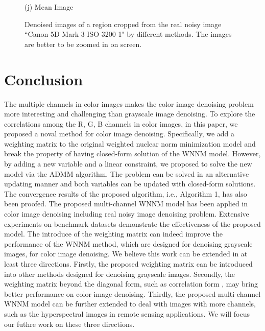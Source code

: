 \documentclass[10pt,twocolumn,letterpaper]{article}
\begin{document}
\begin{figure}
{\begin{minipage}[t]{0.195\textwidth}
{\footnotesize (j) Mean Image \cite{crosschannel2016}}
\end{minipage}
}\vspace{-0.5mm}
\caption{Denoised images of a region cropped from the real noisy image ``Canon 5D Mark 3 ISO 3200 1" \cite{crosschannel2016} by different methods. The images are better to be zoomed in on screen.}
\label{fig7}
\vspace{0.5mm}
\end{figure}

\section{Conclusion}

The multiple channels in color images makes the color image denoising problem more interesting and challenging than grayscale image denoising. To explore the correlations among the R, G, B channels in color images, in this paper, we proposed a noval method for color image denoising. Specifically, we add a weighting matrix to the original weighted nuclear norm minimization model and break the property of having closed-form solution of the WNNM model. However, by adding a new variable and a linear constraint, we proposed to solve the new model via the ADMM algorithm. The problem can be solved in an alternative updating manner and both variables can be updated with closed-form solutions. The convergence results of the proposed algorithm, i.e., Algorithm 1, has also been proofed. The proposed multi-channel WNNM model has been applied in color image denoising including real noisy image denoising problem. Extensive experiments on benchmark datasets demonstrate the effectiveness of the proposed model. The introduce of the weighting matrix can indeed improve the performance of the WNNM method, which are designed for denoising grayscale images, for color image denoising. We believe this work can be extended in at least three directions. Firstly, the proposed weighting matrix can be introduced into other methods designed for denoising grayscale images. Secondly, the weighting matrix beyond the diagonal form, such as correlation form \cite{nearcor}, may bring better performance on color image denoising. Thirdly, the proposed multi-channel WNNM model can be further extended to deal with images with more channels, such as the hyperspectral images in remote sensing applications. We will focus our futhre work on these three directions.
\end{document}
